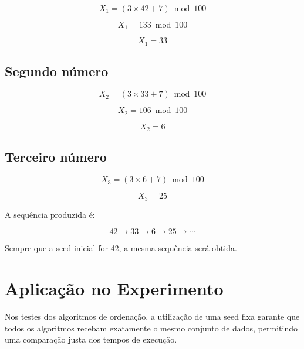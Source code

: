 \documentclass[a4paper,12pt]{article}
\begin{document}
\[
X_1 = (3 \times 42 + 7) \bmod 100
\]

\[
X_1 = 133 \bmod 100
\]

\[
X_1 = 33
\]

\subsection*{Segundo número}

\[
X_2 = (3 \times 33 + 7) \bmod 100
\]

\[
X_2 = 106 \bmod 100
\]

\[
X_2 = 6
\]

\subsection*{Terceiro número}

\[
X_3 = (3 \times 6 + 7) \bmod 100
\]

\[
X_3 = 25
\]

A sequência produzida é:

\[
42 \rightarrow 33 \rightarrow 6 \rightarrow 25 \rightarrow \cdots
\]

Sempre que a seed inicial for 42, a mesma sequência será obtida.

\section{Aplicação no Experimento}

Nos testes dos algoritmos de ordenação, a utilização de uma seed fixa garante
que todos os algoritmos recebam exatamente o mesmo conjunto de dados,
permitindo uma comparação justa dos tempos de execução.
\end{document}

